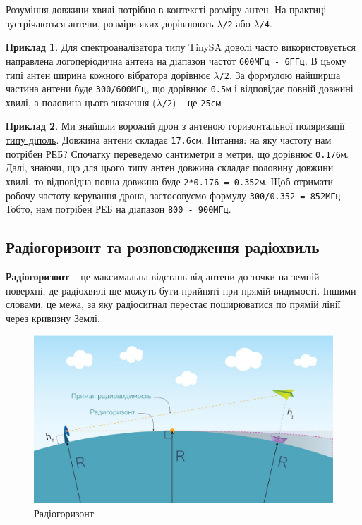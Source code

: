\documentclass{article}
\begin{document}
Розуміння довжини хвилі потрібно в контексті розміру антен. На практиці зустрічаються антени, розміри яких дорівнюють \texttt{$\lambda$/2} або \texttt{$\lambda$/4}.

\textbf{Приклад 1}. Для спектроаналізатора типу TinySA доволі часто використовується направлена логоперіодична антена на діапазон частот \texttt{600МГц - 6ГГц}. В цьому типі антен ширина кожного вібратора дорівнює \texttt{$\lambda$/2}. За формулою найширша частина антени буде \texttt{300/600МГц}, що дорівнює \texttt{0.5м} і відповідає повній довжині хвилі, а половина цього значення (\texttt{$\lambda$/2}) -- це \texttt{25см}.

\textbf{Приклад 2}. Ми знайшли ворожий дрон з антеною горизонтальної поляризації \href{https://modelistam.com.ua/images/dl-ant-rx60.jpg}{типу діполь}. Довжина антени складає \texttt{17.6см}. Питання: на яку частоту нам потрібен РЕБ? Спочатку переведемо сантиметри в метри, що дорівнює \texttt{0.176м}. Далі, знаючи, що для цього типу антен довжина складає половину довжини хвилі, то відповідна повна довжина буде \texttt{2*0.176 = 0.352м}. Щоб отримати робочу частоту керування дрона, застосовуємо формулу \texttt{300/0.352 = 852МГц}. Тобто, нам потрібен РЕБ на діапазон \texttt{800 - 900МГц}.


\subsection{Радіогоризонт та розповсюдження радіохвиль}

\textbf{Радіогоризонт} -- це максимальна відстань від антени до точки на земній поверхні, де радіохвилі ще можуть бути прийняті при прямій видимості. Іншими словами, це межа, за яку радіосигнал перестає поширюватися по прямій лінії через кривизну Землі.

\begin{figure}[h!]
\centering
\includegraphics[width=0.6\linewidth]{images/radio-horizon.jpeg}
\caption{\label{fig:radio-horizon}Радіогоризонт}
\end{figure}
\end{document}

